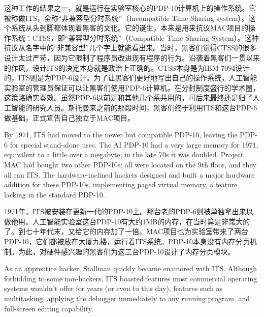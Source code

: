 \ifdefined\chs
这种工作的结果之一，就是运行在实验室核心的PDP-10计算机上的操作系统。它被称做ITS，全称``非兼容型分时系统''（Incompatible Time Sharing system）。这个系统从头到脚都体现着黑客的文化。它的诞生，本来是用来抗议MAC项目的操作系统：CTSS，即``兼容型分时系统''（Compatible Time Sharing System）。这种抗议从名字中的``非兼容型''几个字上就能看出来。当时，黑客们觉得CTSS的很多设计太过严苛，因为它限制了程序员改进现有程序的行为。沿袭着黑客们一贯以来的作风，设计ITS的决定本身就是政治上正确的。CTSS本身是为IBM 7094设计的，ITS则是为PDP-6设计。为了让黑客们更好地写出自己的操作系统，人工智能实验室的管理员保证可以让黑客们使用PDP-6计算机。在分封制度盛行的学术圈，这策略确实奏效。虽然PDP-6以前是和其他几个系共用的，可后来最终还是归了人工智能的研究人员\ifdefined\vtwo。斯托曼来之前的那段时间，黑客们终于利用ITS和这台PDP-6做基础，正式宣告自己独立于MAC项目\fi{}。
\fi

\ifdefined\vtwo
\ifdefined\eng
By 1971, ITS had moved to the newer but compatible PDP-10, leaving the PDP-6 for special stand-alone uses. The AI PDP-10 had a very large memory for 1971, equivalent to a little over a megabyte; in the late 70s it was doubled.   Project MAC had bought two other PDP-10s; all were located on the 9th floor, and they all ran ITS.  The hardware-inclined hackers designed and built a major hardware addition for these PDP-10s, implementing paged virtual memory, a feature lacking in the standard PDP-10.
\fi

\ifdefined\chs
1971年，ITS被安装在更新一代的PDP-10上。那台老的PDP-6则被单独拿出来以做他用。人工智能实验室这台PDP-10有大约1MB的内存，在当时算是非常大的了。到七十年代末，又给它的内存加了一倍。MAC项目也为实验室带来了两台PDP-10，它们都被放在大厦九楼，运行着ITS系统。PDP-10本身没有内存分页机制。为此，对硬件感兴趣的黑客们为这三台PDP-10设计了内存分页模块。
\fi

\ifdefined\eng
As an apprentice hacker, Stallman quickly became enamored with ITS. Although forbidding to some non-hackers, ITS boasted features most commercial operating systems wouldn't offer for years (or even to this day), features such as multitasking, applying the debugger immediately to any running program, and full-screen editing capability. 
\fi

